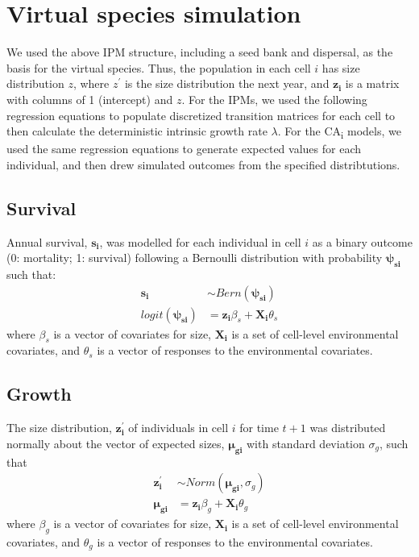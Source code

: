 \documentclass[]{article}
\begin{document}
\newpage
\section{Virtual species simulation}

We used the above IPM structure, including a seed bank and dispersal, as
the basis for the virtual species. Thus, the population in each cell
\(i\) has size distribution \(z\), where \(z^{\prime}\) is the size
distribution the next year, and \(\boldsymbol{z_i}\) is a matrix with
columns of 1 (intercept) and \(z\). For the IPMs, we used the following
regression equations to populate discretized transition matrices for
each cell to then calculate the deterministic intrinsic growth rate
\(\lambda\). For the CA\textsubscript{i} models, we used the same
regression equations to generate expected values for each individual,
and then drew simulated outcomes from the specified distribtutions.

\subsection{Survival}

Annual survival, \(\boldsymbol{s_i}\), was modelled for each individual
in cell \(i\) as a binary outcome (0: mortality; 1: survival) following
a Bernoulli distribution with probability \(\boldsymbol{\psi_{si}}\)
such that: \begin{align}
\boldsymbol{s_i} & \sim Bern(\boldsymbol{\psi_{si}}) \\
logit(\boldsymbol{\psi_{si}}) & = \boldsymbol{z_i}\beta_{s} + \boldsymbol{X_i}\theta_{s}
\end{align} where \(\beta_{s}\) is a vector of covariates for size,
\(\boldsymbol{X_i}\) is a set of cell-level environmental covariates,
and \(\theta_{s}\) is a vector of responses to the environmental
covariates.

\subsection{Growth}

The size distribution, \(\boldsymbol{z^{\prime}_i}\) of individuals in
cell \(i\) for time \(t+1\) was distributed normally about the vector of
expected sizes, \(\boldsymbol{\mu_{gi}}\) with standard deviation
\(\sigma_g\), such that \begin{align}
\boldsymbol{z^{\prime}_i} &\sim Norm(\boldsymbol{\mu_{gi}}, \sigma_g) \\
\boldsymbol{\mu_{gi}} &= \boldsymbol{z_i}\beta_{g} + \boldsymbol{X_i}\theta_{g}
\end{align} where \(\beta_{g}\) is a vector of covariates for size,
\(\boldsymbol{X_i}\) is a set of cell-level environmental covariates,
and \(\theta_{g}\) is a vector of responses to the environmental
covariates.
\end{document}
